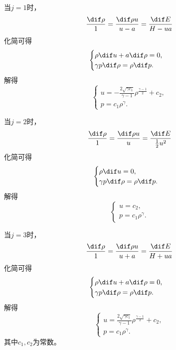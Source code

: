 \documentclass[12pt]{article}
\begin{document}
当$j=1$时，
\begin{equation}
	\frac{\dif \rho}{1}=\frac{\dif \rho u}{u-a}=\frac{\dif E}{H-ua}
\end{equation}
化简可得
\begin{equation}
	\begin{cases}
		\rho \dif u+ a\dif \rho=0,\\
		\gamma p\dif \rho=\rho \dif p.
	\end{cases}
\end{equation}
解得
\begin{equation}
	\begin{cases}
		u=-\frac{2\sqrt{\gamma c_1}}{\gamma-1}\rho^{\frac{\gamma-1}{2}}+c_2,\\
		p=c_1\rho^\gamma.
	\end{cases}
\end{equation}

当$j=2$时，
\begin{equation}
	\frac{\dif \rho}{1}=\frac{\dif \rho u}{u}=\frac{\dif E}{\frac{1}{2}u^2}
\end{equation}
化简可得
\begin{equation}
	\begin{cases}
		\rho \dif u=0,\\
		\gamma p\dif \rho=\rho \dif p.
	\end{cases}
\end{equation}
解得
\begin{equation}
	\begin{cases}
		u=c_2,\\
		p=c_1\rho^\gamma.
	\end{cases}
\end{equation}

当$j=3$时，
\begin{equation}
	\frac{\dif \rho}{1}=\frac{\dif \rho u}{u+a}=\frac{\dif E}{H+ua}
\end{equation}
化简可得
\begin{equation}
	\begin{cases}
		\rho \dif u+ a\dif \rho=0,\\
		\gamma p\dif \rho=\rho \dif p.
	\end{cases}
\end{equation}
解得
\begin{equation}
	\begin{cases}
		u=\frac{2\sqrt{\gamma c_1}}{\gamma-1}\rho^{\frac{\gamma-1}{2}}+c_2,\\
		p=c_1\rho^\gamma.
	\end{cases}
\end{equation}
其中$c_1,c_2$为常数。
\end{document}

